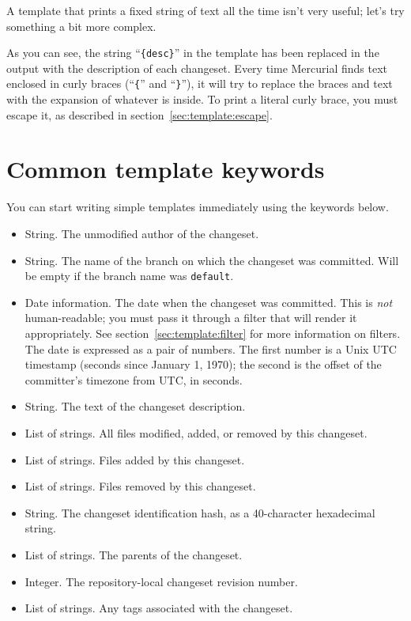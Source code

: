 A template that prints a fixed string of text all the time isn't very
useful; let's try something a bit more complex.


As you can see, the string ``\Verb+{desc}+'' in the template has been
replaced in the output with the description of each changeset.  Every
time Mercurial finds text enclosed in curly braces (``\texttt{\{}''
and ``\texttt{\}}''), it will try to replace the braces and text with
the expansion of whatever is inside.  To print a literal curly brace,
you must escape it, as described in section~\ref{sec:template:escape}.

\section{Common template keywords}
\label{sec:template:keyword}

You can start writing simple templates immediately using the keywords
below.

\begin{itemize}
\item[\tplkword{author}] String.  The unmodified author of the changeset.
\item[\tplkword{branches}] String.  The name of the branch on which
  the changeset was committed.  Will be empty if the branch name was
  \texttt{default}.
\item[\tplkword{date}] Date information.  The date when the changeset
  was committed.  This is \emph{not} human-readable; you must pass it
  through a filter that will render it appropriately.  See
  section~\ref{sec:template:filter} for more information on filters.
  The date is expressed as a pair of numbers.  The first number is a
  Unix UTC timestamp (seconds since January 1, 1970); the second is
  the offset of the committer's timezone from UTC, in seconds.
\item[\tplkword{desc}] String.  The text of the changeset description.
\item[\tplkword{files}] List of strings.  All files modified, added, or
  removed by this changeset.
\item[\tplkword{file\_adds}] List of strings.  Files added by this
  changeset.
\item[\tplkword{file\_dels}] List of strings.  Files removed by this
  changeset.
\item[\tplkword{node}] String.  The changeset identification hash, as a
  40-character hexadecimal string.
\item[\tplkword{parents}] List of strings.  The parents of the
  changeset.
\item[\tplkword{rev}] Integer.  The repository-local changeset revision
  number.
\item[\tplkword{tags}] List of strings.  Any tags associated with the
  changeset.
\end{itemize}

